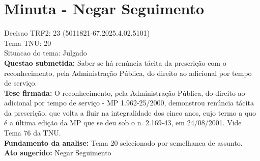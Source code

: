 \documentclass{article}
\begin{document}
\section*{Minuta - Negar Seguimento}
Decisao TRF2: 23 (5011821-67.2025.4.02.5101)\\
Tema TNU: 20\\
Situacao do tema: Julgado\\
\textbf{Questao submetida:} Saber se há renúncia tácita da prescrição com o reconhecimento, pela Administração Pública, do direito ao adicional por tempo de serviço.\\
\textbf{Tese firmada:} O reconhecimento, pela Administração Pública, do direito ao adicional por tempo de serviço - MP 1.962-25/2000, demonstrou renúncia tácita da prescrição, que volta a fluir na integralidade dos cinco anos, cujo termo a quo é a última edição da MP que se deu sob o n. 2.169-43, em 24/08/2001. Vide Tema 76 da TNU.\\
\textbf{Fundamento da analise:} Tema 20 selecionado por semelhanca de assunto.\\
\textbf{Ato sugerido:} Negar Seguimento
\end{document}
